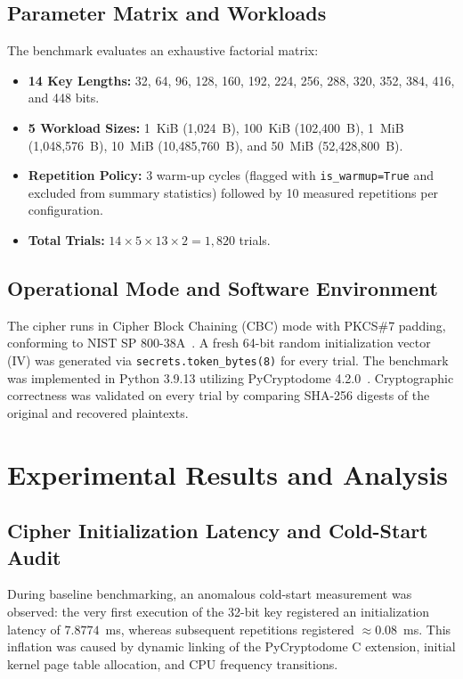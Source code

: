 \documentclass[conference]{IEEEtran}
\begin{document}
\subsection{Parameter Matrix and Workloads}
The benchmark evaluates an exhaustive factorial matrix:
\begin{itemize}
    \item \textbf{14 Key Lengths:} 32, 64, 96, 128, 160, 192, 224, 256, 288, 320, 352, 384, 416, and 448 bits.
    \item \textbf{5 Workload Sizes:} 1~KiB (1,024~B), 100~KiB (102,400~B), 1~MiB (1,048,576~B), 10~MiB (10,485,760~B), and 50~MiB (52,428,800~B).
    \item \textbf{Repetition Policy:} 3 warm-up cycles (flagged with \texttt{is\_warmup=True} and excluded from summary statistics) followed by 10 measured repetitions per configuration.
    \item \textbf{Total Trials:} $14 \times 5 \times 13 \times 2 = 1,820$ trials.
\end{itemize}

\subsection{Operational Mode and Software Environment}
The cipher runs in Cipher Block Chaining (CBC) mode with PKCS\#7 padding, conforming to NIST SP 800-38A~\cite{dworkin2001nist}. A fresh 64-bit random initialization vector (IV) was generated via \texttt{secrets.token\_bytes(8)} for every trial. The benchmark was implemented in Python 3.9.13 utilizing PyCryptodome 4.2.0~\cite{pycryptodome2024}. Cryptographic correctness was validated on every trial by comparing SHA-256 digests of the original and recovered plaintexts.

\section{Experimental Results and Analysis}

\subsection{Cipher Initialization Latency and Cold-Start Audit}
During baseline benchmarking, an anomalous cold-start measurement was observed: the very first execution of the 32-bit key registered an initialization latency of $7.8774$~ms, whereas subsequent repetitions registered $\approx 0.08$~ms. This inflation was caused by dynamic linking of the PyCryptodome C extension, initial kernel page table allocation, and CPU frequency transitions. 
\end{document}
